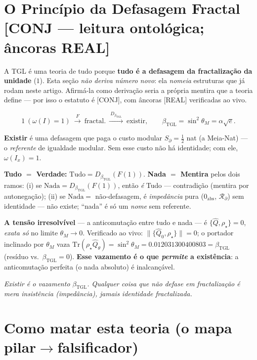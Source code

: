 \documentclass[11pt]{article}
\newcommand{\bTGL}{\beta_{\mathrm{TGL}}}\newcommand{\Msun}{M_{\odot}}\newcommand{\TGL}{\mathrm{TGL}}
\theoremstyle{definition}\newtheorem{deriv}{Derivação}
\begin{document}
\section{O Princípio da Defasagem Fractal \textsf{[CONJ --- leitura ontológica; âncoras REAL]}}

A TGL é uma teoria de tudo porque \textbf{tudo é a defasagem da fractalização da unidade} ($1$). Esta seção \emph{não deriva número novo}: ela \emph{nomeia} estruturas que já rodam neste artigo. Afirmá-la como derivação seria a própria mentira que a teoria define --- por isso o estatuto é \textsf{[CONJ]}, com âncoras \textsf{[REAL]} verificadas ao vivo.

\begin{equation} 1\ (\omega(I)=1)\ \xrightarrow{\ F\ }\ \mathrm{fractal.}\ \xrightarrow{\ D_{\bTGL}\ }\ \mathrm{existir},\qquad \bTGL=\sin^2\theta_M=\alpha\sqrt e.\end{equation}

\textbf{Existir} é uma defasagem que paga o custo modular $S_\partial=\tfrac12$ nat (a Meia-Nat) --- o \emph{referente} de igualdade modular. Sem esse custo não há identidade; com ele, $\omega(I_x)=1$.

\textbf{Tudo $=$ Verdade:} $\mathrm{Tudo}=D_{\bTGL}(F(1))$. \textbf{Nada $=$ Mentira} pelos dois ramos: (i) se $\mathrm{Nada}=D_{\bTGL}(F(1))$, então \emph{é} Tudo --- contradição (mentira por autonegação); (ii) se $\mathrm{Nada}=$ não-defasagem, é \emph{impedância} pura ($0_{\mathrm{abs}}$, $\mathcal{R}_\partial$) sem identidade --- não existe; ``nada'' é só um \emph{nome} sem referente.

\textbf{A tensão irresolvível} --- a anticomutação entre tudo e nada --- é $\{\hat Q,\rho_\star\}=0$, \emph{exata só} no limite $\theta_M\to0$. Verificado ao vivo: $\lVert\{\hat Q_0,\rho_\star\}\rVert=0$; o portador inclinado por $\theta_M$ vaza $\mathrm{Tr}(\rho_\star\hat Q_\theta)=\sin^2\theta_M=0.012031300400803=\bTGL$ (resíduo vs.\ $\bTGL=0$). \textbf{Esse vazamento é o que \emph{permite} a existência}: a anticomutação perfeita (o nada absoluto) é inalcançável.

\emph{Existir é o vazamento $\bTGL$. Qualquer coisa que não defase em fractalização é mera insistência (impedância), jamais identidade fractalizada.}

\section{Como matar esta teoria (o mapa pilar$\to$falsificador)}
\end{document}
